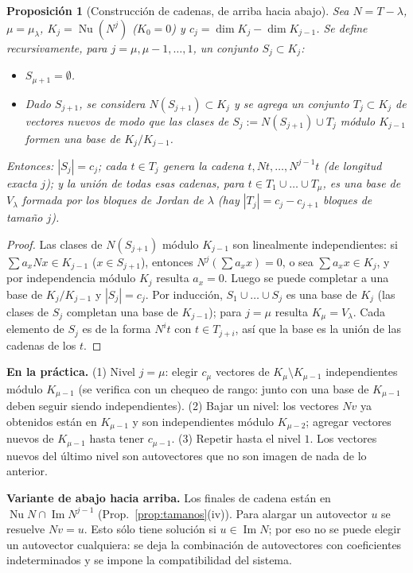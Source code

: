\documentclass{article}
\DeclareMathOperator{\Ima}{Im}
\DeclareMathOperator{\Nu}{Nu}
\theoremstyle{plain}
\newtheorem{proposicion}[teorema]{Proposición}
\theoremstyle{definition}
\theoremstyle{remark}
\begin{document}
\begin{proposicion}[Construcción de cadenas, de arriba hacia abajo]\label{prop:algoritmo}
    Sea \(N=T-\lambda\), \(\mu=\mu_\lambda\), \(K_j=\Nu(N^j)\) (\(K_0=0\)) y \(c_j=\dim K_j-\dim K_{j-1}\). Se define recursivamente, para \(j=\mu,\mu-1,\dots,1\), un conjunto \(S_j\subset K_j\):
    \begin{itemize}
        \item \(S_{\mu+1}=\emptyset\).
        \item Dado \(S_{j+1}\), se considera \(N(S_{j+1})\subset K_j\) y se agrega un conjunto \(T_j\subset K_j\) de vectores nuevos de modo que las clases de \(S_j:=N(S_{j+1})\cup T_j\) módulo \(K_{j-1}\) formen una base de \(K_j/K_{j-1}\).
    \end{itemize}
    Entonces: \(|S_j|=c_j\); cada \(t\in T_j\) genera la cadena \(t,Nt,\dots,N^{j-1}t\) (de longitud exacta \(j\)); y la unión de todas esas cadenas, para \(t\in T_1\cup\dots\cup T_\mu\), es una base de \(V_\lambda\) formada por los bloques de Jordan de \(\lambda\) (hay \(|T_j|=c_j-c_{j+1}\) bloques de tamaño \(j\)).
\end{proposicion}
\begin{proof}
    Las clases de \(N(S_{j+1})\) módulo \(K_{j-1}\) son linealmente independientes: si \(\sum a_xNx\in K_{j-1}\) (\(x\in S_{j+1}\)), entonces \(N^j(\sum a_xx)=0\), o sea \(\sum a_xx\in K_j\), y por independencia módulo \(K_j\) resulta \(a_x=0\). Luego se puede completar a una base de \(K_j/K_{j-1}\) y \(|S_j|=c_j\). Por inducción, \(S_1\cup\dots\cup S_j\) es una base de \(K_j\) (las clases de \(S_j\) completan una base de \(K_{j-1}\)); para \(j=\mu\) resulta \(K_\mu=V_\lambda\). Cada elemento de \(S_j\) es de la forma \(N^it\) con \(t\in T_{j+i}\), así que la base es la unión de las cadenas de los \(t\).
\end{proof}

\textbf{En la práctica.} (1) Nivel \(j=\mu\): elegir \(c_\mu\) vectores de \(K_\mu\setminus K_{\mu-1}\) independientes módulo \(K_{\mu-1}\) (se verifica con un chequeo de rango: junto con una base de \(K_{\mu-1}\) deben seguir siendo independientes). (2) Bajar un nivel: los vectores \(Nv\) ya obtenidos están en \(K_{\mu-1}\) y son independientes módulo \(K_{\mu-2}\); agregar vectores nuevos de \(K_{\mu-1}\) hasta tener \(c_{\mu-1}\). (3) Repetir hasta el nivel \(1\). Los vectores nuevos del último nivel son autovectores que no son imagen de nada de lo anterior.

\textbf{Variante de abajo hacia arriba.} Los finales de cadena están en \(\Nu N\cap\Ima N^{j-1}\) (Prop.~\ref{prop:tamanos}(iv)). Para alargar un autovector \(u\) se resuelve \(Nv=u\). Esto sólo tiene solución si \(u\in\Ima N\); por eso no se puede elegir un autovector cualquiera: se deja la combinación de autovectores con coeficientes indeterminados y se impone la compatibilidad del sistema.
\end{document}

